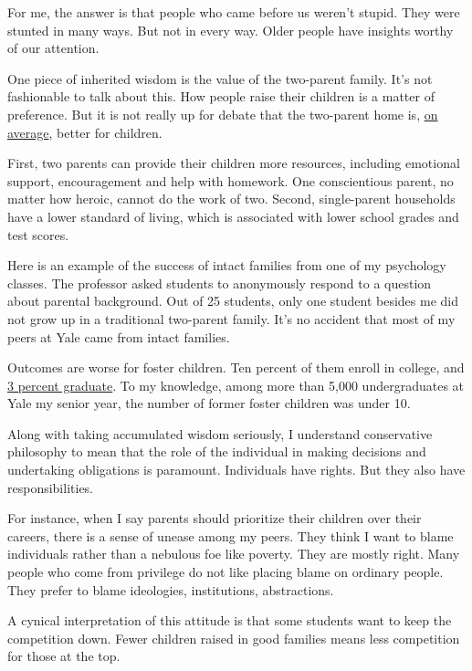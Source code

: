 For me, the answer is that people who came before us weren't stupid.
They were stunted in many ways. But not in every way. Older people have
insights worthy of our attention.

One piece of inherited wisdom is the value of the two-parent family.
It's not fashionable to talk about this. How people raise their children
is a matter of preference. But it is not really up for debate that the
two-parent home is,
\href{http://www.nytimes.com/2012/07/15/us/two-classes-in-america-divided-by-i-do.html}{on
average}, better for children.

First, two parents can provide their children more resources, including
emotional support, encouragement and help with homework. One
conscientious parent, no matter how heroic, cannot do the work of two.
Second, single-parent households have a lower standard of living, which
is associated with lower school grades and test scores.

Here is an example of the success of intact families from one of my
psychology classes. The professor asked students to anonymously respond
to a question about parental background. Out of 25 students, only one
student besides me did not grow up in a traditional two-parent family.
It's no accident that most of my peers at Yale came from intact
families.

Outcomes are worse for foster children. Ten percent of them enroll in
college, and
\href{https://www.sciencedaily.com/releases/2015/04/150419193908.htm}{3
percent graduate}. To my knowledge, among more than 5,000 undergraduates
at Yale my senior year, the number of former foster children was under
10.

Along with taking accumulated wisdom seriously, I understand
conservative philosophy to mean that the role of the individual in
making decisions and undertaking obligations is paramount. Individuals
have rights. But they also have responsibilities.

For instance, when I say parents should prioritize their children over
their careers, there is a sense of unease among my peers. They think I
want to blame individuals rather than a nebulous foe like poverty. They
are mostly right. Many people who come from privilege do not like
placing blame on ordinary people. They prefer to blame ideologies,
institutions, abstractions.

A cynical interpretation of this attitude is that some students want to
keep the competition down. Fewer children raised in good families means
less competition for those at the top.

